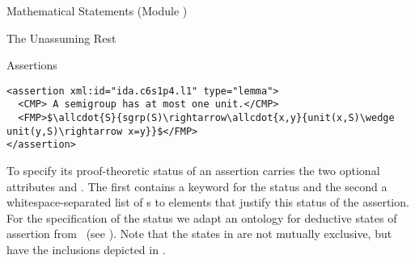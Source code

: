 \begin{tchapter}[id=statements,short=Mathematical Statements]{Mathematical Statements (Module {})}
\begin{tsection}[id=assertion]{The Unassuming Rest}
\begin{tsubsection}[id=assertions]{Assertions}
\begin{lstlisting}[label=lst:assertion,mathescape,
  caption={An {\omdoc} Assertion About Semigroups},
  index={assertion}]
<assertion xml:id="ida.c6s1p4.l1" type="lemma">
  <CMP> A semigroup has at most one unit.</CMP>
  <FMP>$\allcdot{S}{sgrp(S)\rightarrow\allcdot{x,y}{unit(x,S)\wedge unit(y,S)\rightarrow x=y}}$</FMP>
</assertion>
\end{lstlisting}

To specify its proof-theoretic status of an assertion {} carries the
two optional attributes {} and
{}. The first contains a keyword for the status and the
second a whitespace-separated list of {s} to {\omdoc} elements
that justify this status of the assertion. For the specification of the status we adapt an
ontology for deductive states of assertion from~\cite{SutZimSch:tdefatpt04} (see
{}). Note that the states in {} are not
mutually exclusive, but have the inclusions depicted in
{}.


\end{tsubsection}
\end{tsection}
\end{tchapter}
